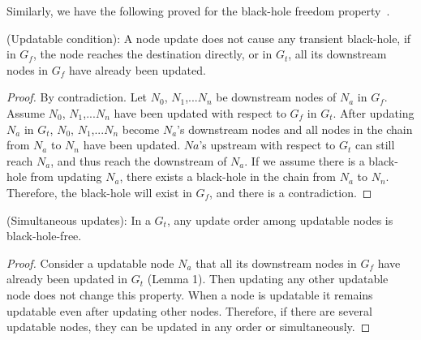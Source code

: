 

Similarly, we have the following proved for the black-hole freedom property~\cite{gcc_tr}.

  \vspace{-0.1in}
\begin{lemma} (Updatable condition):
A node update does not cause any transient black-hole,
if in $G_f$, the node reaches the destination directly, or
in $G_t$, all its downstream nodes in $G_f$ have already been updated.
\end{lemma}
  \vspace{-0.1in}

  \vspace{-0.1in}
\begin{proof} By contradiction. Let $N_0$, $N_1$,...$N_n$ be downstream
nodes of $N_a$ in $G_f$. Assume $N_0$, $N_1$,...$N_n$ 
have been updated with respect to $G_f$ in $G_t$.
After updating $N_a$ in $G_t$, $N_0$, $N_1$,...$N_n$ become $N_a$'s
downstream nodes and
all nodes in the chain from $N_a$ to $N_n$ have been updated. %
 $Na$'s upstream with respect to $G_t$ can still reach $N_a$, and thus reach the downstream of $N_a$.
If we assume there is a black-hole from updating $N_a$,
there exists a black-hole in the chain from $N_a$ to $N_n$.
Therefore, the black-hole will exist in 
$G_f$, and there is a contradiction.
\end{proof}
  \vspace{-0.1in}


  \vspace{-0.1in}
\begin{lemma} (Simultaneous updates): In
a $G_t$, any update order among updatable nodes is black-hole-free.  
\end{lemma}
  \vspace{-0.1in}

  \vspace{-0.1in}
\begin{proof} Consider a updatable node $N_a$ that all its downstream nodes in
$G_f$ have already been updated in $G_t$ (Lemma 1). 
Then updating any other updatable node does not change this
property. When a node is updatable it remains updatable even after updating
other nodes. Therefore, if there are several updatable nodes, they can be
updated in any order or simultaneously.  
\end{proof}
  \vspace{-0.1in}

